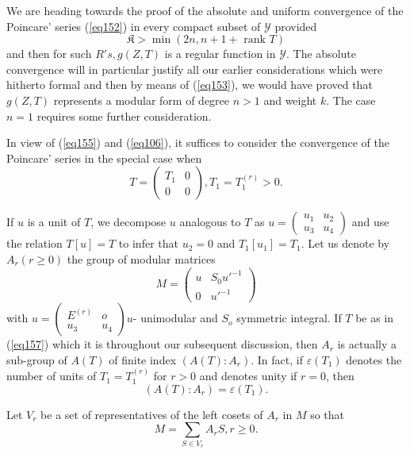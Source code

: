We are heading towards the proof of the absolute and uniform
convergence of the Poincare' series (\ref{eq152}) in every compact subset of
$\mathscr{Y}$ provided 
\begin{equation*}
\mathfrak{K} > \min (2n, n+1 + \text{ rank  } T) \tag{156}\label{eq156} 
\end{equation*}
and then for such $ R' s, g(Z, T)$ is a regular function in
$\mathscr{Y}$. The absolute convergence will in particular justify all
our earlier considerations which were hitherto formal and then by
means of (\ref{eq153}), we would have proved that $g ( Z, T )$ represents a
modular form of degree $n>1$ and weight $k$. The case $n = 1$ requires
some further consideration.\pageoriginale  

In view of (\ref{eq155}) and (\ref{eq106}), it suffices to consider the
convergence of the Poincare' series in the special case when  
\begin{equation*}
T = \begin{pmatrix} T_1 & 0 \\ 0 & 0\end{pmatrix}, T_1 = T_1^{(r)} >
  0. \tag{157}\label{eq157} 
\end{equation*}

If $u$ is a unit of $T$, we decompose $u$ analogous to $T$ as $u
= \begin{pmatrix} u_1 & u_2\\ u_3 & u_4 \end{pmatrix}$ and use the
relation $T [ u ] = T$ to infer that $u_2 = 0$ and $T_1 [ u_1 ] =
T_1$. Let us denote by $A_r (r \geq 0)$ the group of modular matrices 
\begin{equation*}
M = \begin{pmatrix} u & S_0 u'^{-1} \\ 0 & u'^{-1} \end{pmatrix}
\tag{158}\label{eq158} 
\end{equation*}
with $u = \begin{pmatrix} E^{(r)} & o \\ u_3 & u_4 \end{pmatrix} u$-
unimodular and $S_o$ symmetric integral. If $T$ be as in (\ref{eq157}) which
it is throughout our subsequent discussion, then $A_r$ is actually a
sub-group of $A(T)$ of finite index $(A (T): A_r)$. In fact, if
$\varepsilon (T_1)$ denotes the number of units of $T_1 = T_1^{(r)}$
for $r>0$ and denotes unity if $r = 0$, then 
$$
(A (T) : A_r ) = \varepsilon (T_1).
$$

Let $V_r$ be a set of representatives of the left cosets of $A_r$ in
$M$ so that  
\begin{equation*}
M = \sum_{S \in V_r} A_r S, r \geq 0. \tag{159}\label{eq159}
\end{equation*}

